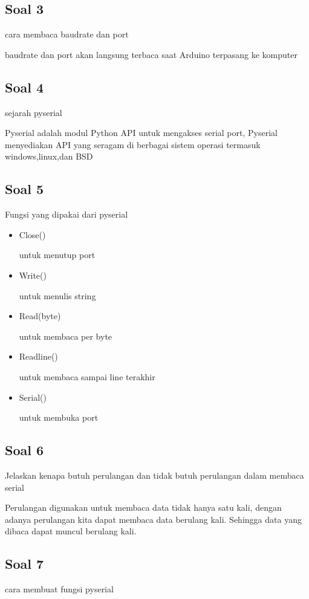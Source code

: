 \subsection{Soal 3}
cara membaca baudrate dan port

baudrate dan port akan langsung terbaca saat Arduino terpasang ke komputer

\subsection{Soal 4}
sejarah pyserial

Pyserial adalah modul Python API untuk mengakses serial port, Pyserial menyediakan API yang seragam di berbagai sistem operasi termasuk windows,linux,dan BSD

\subsection{Soal 5}
Fungsi yang dipakai dari pyserial

\begin{itemize}
	\item Close()

	untuk menutup port

	\item Write()

	untuk menulis string

	\item Read(byte)

	untuk membaca per byte

	\item Readline()

	untuk membaca sampai line terakhir

	\item Serial()

	untuk membuka port

\end{itemize}
\subsection{Soal 6}
Jelaskan kenapa butuh perulangan dan tidak butuh perulangan dalam membaca serial

Perulangan digunakan untuk membaca data tidak hanya satu kali, dengan adanya perulangan kita dapat membaca data berulang kali. Sehingga data yang dibaca dapat muncul berulang kali.

\subsection{Soal 7}
cara membuat fungsi pyserial

